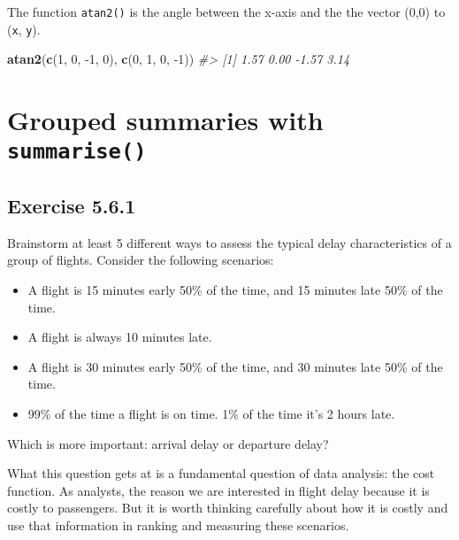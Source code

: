 \documentclass[]{book}
\newenvironment{Shaded}{\begin{snugshade}}{\end{snugshade}}
\newcommand{\CommentTok}[1]{\textcolor[rgb]{0.56,0.35,0.01}{\textit{#1}}}
\newcommand{\DecValTok}[1]{\textcolor[rgb]{0.00,0.00,0.81}{#1}}
\newcommand{\KeywordTok}[1]{\textcolor[rgb]{0.13,0.29,0.53}{\textbf{#1}}}
\newcommand{\NormalTok}[1]{#1}
\providecommand{\tightlist}{%
  \setlength{\itemsep}{0pt}\setlength{\parskip}{0pt}}
\theoremstyle{plain}
\theoremstyle{remark}
\begin{document}
The function \texttt{atan2()} is the angle between the x-axis and the
the vector (0,0) to (\texttt{x}, \texttt{y}).

\begin{Shaded}
\begin{Highlighting}[]
\KeywordTok{atan2}\NormalTok{(}\KeywordTok{c}\NormalTok{(}\DecValTok{1}\NormalTok{, }\DecValTok{0}\NormalTok{, }\DecValTok{-1}\NormalTok{, }\DecValTok{0}\NormalTok{), }\KeywordTok{c}\NormalTok{(}\DecValTok{0}\NormalTok{, }\DecValTok{1}\NormalTok{, }\DecValTok{0}\NormalTok{, }\DecValTok{-1}\NormalTok{))}
\CommentTok{#> [1]  1.57  0.00 -1.57  3.14}
\end{Highlighting}
\end{Shaded}

\hypertarget{grouped-summaries-with-summarise}{%
\section{\texorpdfstring{Grouped summaries with
\texttt{summarise()}}{Grouped summaries with summarise()}}\label{grouped-summaries-with-summarise}}

\hypertarget{exercise-5.6.1}{%
\subsection*{\texorpdfstring{Exercise
{5.6.1}}{Exercise 5.6.1}}\label{exercise-5.6.1}}

Brainstorm at least 5 different ways to assess the typical delay
characteristics of a group of flights. Consider the following scenarios:

\begin{itemize}
\tightlist
\item
  A flight is 15 minutes early 50\% of the time, and 15 minutes late
  50\% of the time.
\item
  A flight is always 10 minutes late.
\item
  A flight is 30 minutes early 50\% of the time, and 30 minutes late
  50\% of the time.
\item
  99\% of the time a flight is on time. 1\% of the time it's 2 hours
  late.
\end{itemize}

Which is more important: arrival delay or departure delay?

What this question gets at is a fundamental question of data analysis:
the cost function. As analysts, the reason we are interested in flight
delay because it is costly to passengers. But it is worth thinking
carefully about how it is costly and use that information in ranking and
measuring these scenarios.
\end{document}
